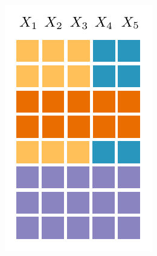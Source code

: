 \documentclass[final]{beamer}
\begin{document}
\begin{frame}{}
\begin{textblock}{80}
{\begin{minipage}[t]{5.67cm}
    \end{minipage}}\hspace{30pt}\begin{minipage}[t]{4.986cm}
      \includegraphics[width=\linewidth]{figures/grid-2}
    \end{minipage}\hspace{30pt}\raisebox{42pt}{\begin{minipage}[t]{6.48cm}

\end{minipage}}
\end{textblock}
\end{frame}
\end{document}
